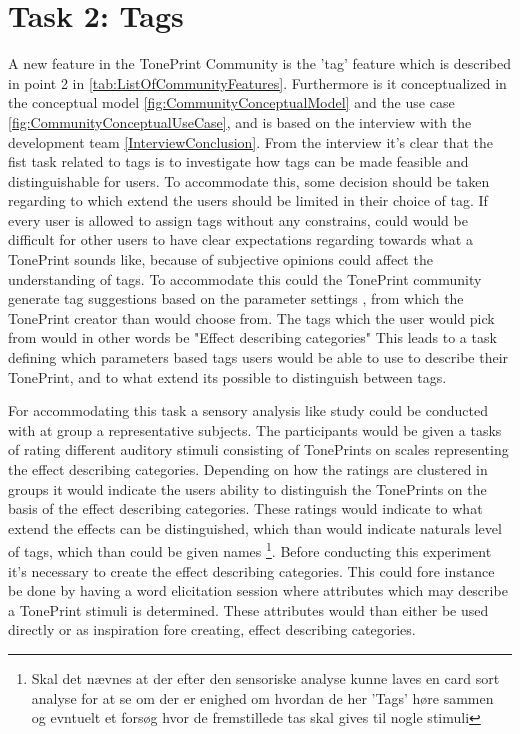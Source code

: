 \section{Task 2: Tags}
\label{Task2}

A new feature in the TonePrint Community is the 'tag' feature which is described in point 2 in \autoref{tab:ListOfCommunityFeatures}. Furthermore is it conceptualized in the conceptual model \autoref{fig:CommunityConceptualModel} and the use case \autoref{fig:CommunityConceptualUseCase}, and is based on the interview  with the development team \autoref{InterviewConclusion}. From the interview it's clear that the fist task related to tags is to investigate how tags can be made feasible and distinguishable for users. To accommodate this, some decision should be taken regarding to which extend the users should be limited in their choice of tag. If every user is allowed to assign tags without any constrains, could would be difficult for other users to have clear expectations regarding towards what a TonePrint sounds like, because of subjective opinions could affect the understanding of tags. To accommodate this could the TonePrint community generate tag suggestions based on the parameter settings , from which the TonePrint creator than would choose from. The tags which the user would pick from would in other words be "Effect describing categories" This leads to a task defining which parameters based tags users would be able to use to describe their TonePrint, and to what extend its possible to distinguish between tags.

\noindent
For accommodating this task a sensory analysis like study could be conducted with at group a representative subjects. The participants would be given a tasks of rating different auditory stimuli consisting of TonePrints on scales representing the effect describing categories. Depending on how the ratings are clustered in groups it would indicate the users ability to distinguish the TonePrints on the basis of the effect describing categories. These ratings would indicate to what extend the effects can be distinguished, which than would indicate naturals level of tags, which than could be given names \footnote{Skal det nævnes at der efter den sensoriske analyse kunne laves en card sort analyse for at se om der er enighed om hvordan de her 'Tags' høre sammen og evntuelt et forsøg hvor de fremstillede tas skal gives til nogle stimuli}. Before conducting this experiment it's necessary to create the effect describing categories. This could fore instance be done by having a word elicitation session where attributes which may describe a TonePrint stimuli is determined. These attributes would than either be used directly or as inspiration fore creating, effect describing categories.\\

